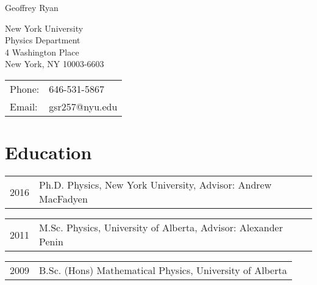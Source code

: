 \documentclass[letterpaper]{article}
\def\name{Geoffrey Ryan}
\renewenvironment{itemize}{
  \begin{list}{}{
    \setlength{\leftmargin}{1.5em}
  }
}{
  \end{list}
}
\begin{document}
{\huge \name}


\vspace{0.25in}

\begin{minipage}{0.45\linewidth}
  New York University \\
  Physics Department\\
  4 Washington Place\\
  New York, NY 10003-6603
\end{minipage}
\begin{minipage}{0.45\linewidth}
  \begin{tabular}{ll}
    Phone: & 646-531-5867 \\
    Email: &  gsr257@nyu.edu \\
  \end{tabular}
\end{minipage}

\section*{Education}
\begin{itemize}
\item \begin{tabular}{ll}
2016 & Ph.D. Physics, New York University, Advisor: Andrew MacFadyen \\
\end{tabular}

\item \begin{tabular}{ll}
2011 &  M.Sc. Physics, University of Alberta, Advisor: Alexander Penin \\
\end{tabular}

\item \begin{tabular}{ll}
2009 &  B.Sc. (Hons) Mathematical Physics, University of Alberta \\
\end{tabular}
\end{itemize}

\end{document}
